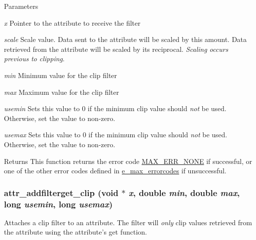\begin{DoxyParams}{Parameters}
\item[{\em x}]Pointer to the attribute to receive the filter \item[{\em scale}]Scale value. Data sent to the attribute will be scaled by this amount. Data retrieved from the attribute will be scaled by its reciprocal. {\itshape Scaling occurs previous to clipping\/}. \item[{\em min}]Minimum value for the clip filter \item[{\em max}]Maximum value for the clip filter \item[{\em usemin}]Sets this value to 0 if the minimum clip value should {\itshape not\/} be used. Otherwise, set the value to non-\/zero. \item[{\em usemax}]Sets this value to 0 if the minimum clip value should {\itshape not\/} be used. Otherwise, set the value to non-\/zero.\end{DoxyParams}
\begin{DoxyReturn}{Returns}
This function returns the error code \hyperlink{group__misc_gga0764dd6c02b76cca7d053ae50555d69da6d22f77fef8b1e1b074cef5d29d935fd}{MAX\_\-ERR\_\-NONE} if successful, or one of the other error codes defined in \hyperlink{group__misc_ga0764dd6c02b76cca7d053ae50555d69d}{e\_\-max\_\-errorcodes} if unsuccessful. 
\end{DoxyReturn}
\hypertarget{group__attr_ga911c88048fc1d4d38969235c4d17cc4e}{
\subsubsection[{attr\_\-addfilterget\_\-clip}]{ attr\_\-addfilterget\_\-clip (void $\ast$ {\em x}, \/  double {\em min}, \/  double {\em max}, \/  long {\em usemin}, \/  long {\em usemax})}}
\label{group__attr_ga911c88048fc1d4d38969235c4d17cc4e}


Attaches a clip filter to an attribute. The filter will {\itshape only\/} clip values retrieved from the attribute using the attribute's {\ttfamily get} function.


